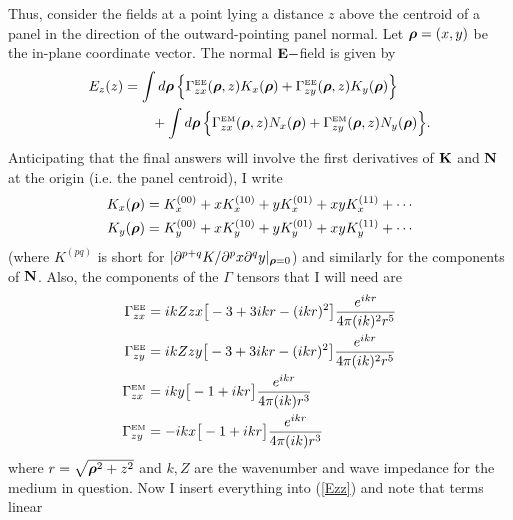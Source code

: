 Thus, consider the fields at a point lying a distance $z$
above the centroid of a panel in the direction of the 
outward-pointing panel normal. Let $\boldsymbol{\rho}=(x,y)$ be the
in-plane coordinate vector. The normal $\mathbf{E}-$field is given by
\begin{align}
E_z(z) 
 &= \int d\boldsymbol{\rho} \, \Big\{ 
             \Gamma_{zx}^{\hbox{\tiny{EE}}}(\boldsymbol{\rho}, z) K_x(\boldsymbol{\rho}) 
            +\Gamma_{zy}^{\hbox{\tiny{EE}}}(\boldsymbol{\rho}, z) K_y(\boldsymbol{\rho}) 
           \Big\}
\nonumber \\
&\qquad
   + \int d\boldsymbol{\rho} \, \Big\{ 
             \Gamma_{zx}^{\hbox{\tiny{EM}}}(\boldsymbol{\rho}, z) N_x(\boldsymbol{\rho}) 
            +\Gamma_{zy}^{\hbox{\tiny{EM}}}(\boldsymbol{\rho}, z) N_y(\boldsymbol{\rho}) 
           \Big\}.
\label{Ezz}
\end{align}
Anticipating that the final answers will involve the 
first derivatives of $\mathbf{K}$ and $\mathbf{N}$ at the origin (i.e. the panel 
centroid), I write
\begin{align*}
 K_x(\boldsymbol{\rho}) &= K_x^{(00)} + x K_x^{(10)} + y K_x^{(01)} + xyK_x^{(11)}
  + \cdots 
\\
 K_y(\boldsymbol{\rho}) &= K_y^{(00)} + x K_y^{(10)} + y K_y^{(01)} + xyK_y^{(11)}
  + \cdots
\end{align*}
(where $K^{(pq)}$ is short 
for $|\partial^{p+q} K/\partial^p x \partial^q y|_{\boldsymbol{\rho}=0}$)
and similarly for the components of $\mathbf{N}$.
Also, the components of the $\Gamma$ tensors that I will need are
\begin{align*}
 \Gamma^{\hbox{\tiny{EE}}}_{zx} &= i k Z zx \big[-3 + 3ikr - (ikr)^2\big]
  \frac{e^{ikr}}{4\pi (ik)^2 r^5}
\\
 \Gamma^{\hbox{\tiny{EE}}}_{zy} &= i k Z zy \big[-3 + 3ikr - (ikr)^2\big]
  \frac{e^{ikr}}{4\pi (ik)^2 r^5}
\\
 \Gamma^{\hbox{\tiny{EM}}}_{zx} &= i k y \big[-1 + ikr\big]
  \frac{e^{ikr}}{4\pi (ik) r^3}
\\
 \Gamma^{\hbox{\tiny{EM}}}_{zy} &= -i k x \big[-1 +ikr\big]
  \frac{e^{ikr}}{4\pi (ik) r^3}
\end{align*}
where $r=\sqrt{\boldsymbol{\rho}^2 + z^2}$ and $k,Z$ are the wavenumber and
wave impedance for the medium in question.
Now I insert everything into (\ref{Ezz}) and note that terms linear
